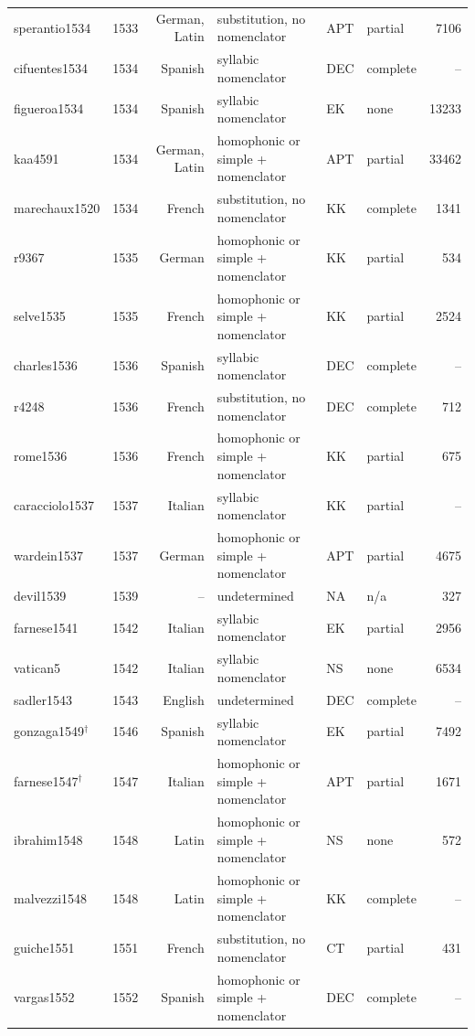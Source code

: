 {\begin{longtable}{@{}llrlllr@{}}
sperantio1534 & 1533 & German, Latin & substitution, no nomenclator & APT & partial & 7106 \\
cifuentes1534 & 1534 & Spanish & syllabic nomenclator & DEC & complete & -- \\
figueroa1534 & 1534 & Spanish & syllabic nomenclator & EK & none & 13233 \\
kaa4591 & 1534 & German, Latin & homophonic or simple + nomenclator & APT & partial & 33462 \\
marechaux1520 & 1534 & French & substitution, no nomenclator & KK & complete & 1341 \\
r9367 & 1535 & German & homophonic or simple + nomenclator & KK & partial & 534 \\
selve1535 & 1535 & French & homophonic or simple + nomenclator & KK & partial & 2524 \\
charles1536 & 1536 & Spanish & syllabic nomenclator & DEC & complete & -- \\
r4248 & 1536 & French & substitution, no nomenclator & DEC & complete & 712 \\
rome1536 & 1536 & French & homophonic or simple + nomenclator & KK & partial & 675 \\
caracciolo1537 & 1537 & Italian & syllabic nomenclator & KK & partial & -- \\
wardein1537 & 1537 & German & homophonic or simple + nomenclator & APT & partial & 4675 \\
devil1539 & 1539 & -- & undetermined & NA & n/a & 327 \\
farnese1541 & 1542 & Italian & syllabic nomenclator & EK & partial & 2956 \\
vatican5 & 1542 & Italian & syllabic nomenclator & NS & none & 6534 \\
sadler1543 & 1543 & English & undetermined & DEC & complete & -- \\
gonzaga1549$^\dagger$ & 1546 & Spanish & syllabic nomenclator & EK & partial & 7492 \\
farnese1547$^\dagger$ & 1547 & Italian & homophonic or simple + nomenclator & APT & partial & 1671 \\
ibrahim1548 & 1548 & Latin & homophonic or simple + nomenclator & NS & none & 572 \\
malvezzi1548 & 1548 & Latin & homophonic or simple + nomenclator & KK & complete & -- \\
guiche1551 & 1551 & French & substitution, no nomenclator & CT & partial & 431 \\
vargas1552 & 1552 & Spanish & homophonic or simple + nomenclator & DEC & complete & -- \\

\end{longtable}}
